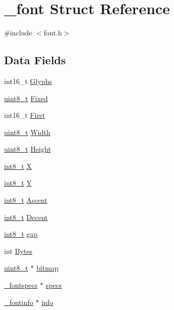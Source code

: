 \hypertarget{struct__font}{}\section{\+\_\+font Struct Reference}
\label{struct__font}


{\ttfamily \#include $<$font.\+h$>$}

\subsection*{Data Fields}
\begin{DoxyCompactItemize}
\item 
int16\+\_\+t \hyperlink{struct__font_a1e89c06fc11a730eb602522dc8953491}{Glyphs}
\item 
\hyperlink{send_8c_aba7bc1797add20fe3efdf37ced1182c5}{uint8\+\_\+t} \hyperlink{struct__font_a76218c6b35acb78926429f247cbaa687}{Fixed}
\item 
int16\+\_\+t \hyperlink{struct__font_a73decb2a2c2880dc782cd9cda5561876}{First}
\item 
\hyperlink{send_8c_aba7bc1797add20fe3efdf37ced1182c5}{uint8\+\_\+t} \hyperlink{struct__font_ae3d3b48670f1bf4bf6dbf42794f81b31}{Width}
\item 
\hyperlink{send_8c_aba7bc1797add20fe3efdf37ced1182c5}{uint8\+\_\+t} \hyperlink{struct__font_a5888921d1a78bf917351a275e2033467}{Height}
\item 
\hyperlink{earth2wireframe_8c_aef44329758059c91c76d334e8fc09700}{int8\+\_\+t} \hyperlink{struct__font_a64a08fdbdaa19418a9b7a34a2db33150}{X}
\item 
\hyperlink{earth2wireframe_8c_aef44329758059c91c76d334e8fc09700}{int8\+\_\+t} \hyperlink{struct__font_a3c9fee9cfcc713b1aac812c14dd9a36a}{Y}
\item 
\hyperlink{earth2wireframe_8c_aef44329758059c91c76d334e8fc09700}{int8\+\_\+t} \hyperlink{struct__font_a998e54724f56879aa85c5ec169873f39}{Ascent}
\item 
\hyperlink{earth2wireframe_8c_aef44329758059c91c76d334e8fc09700}{int8\+\_\+t} \hyperlink{struct__font_a7f3567884a6aa454b7414b10dba35755}{Decent}
\item 
\hyperlink{earth2wireframe_8c_aef44329758059c91c76d334e8fc09700}{int8\+\_\+t} \hyperlink{struct__font_af4d840b8e62f6a0548cef0a5474416f4}{gap}
\item 
int \hyperlink{struct__font_a13b0b0e4e91f4d663ba4c3c11bfbda8a}{Bytes}
\item 
\hyperlink{send_8c_aba7bc1797add20fe3efdf37ced1182c5}{uint8\+\_\+t} $\ast$ \hyperlink{struct__font_a336f543c3fe3d3197c6e709fa7df0f5b}{bitmap}
\item 
\hyperlink{struct__fontspecs}{\+\_\+fontspecs} $\ast$ \hyperlink{struct__font_a76b5b07cf75a869627eca27d7a32836a}{specs}
\item 
\hyperlink{struct__fontinfo}{\+\_\+fontinfo} $\ast$ \hyperlink{struct__font_abf134e8a44e707d3b4e83ab76c952ed9}{info}
\end{DoxyCompactItemize}


